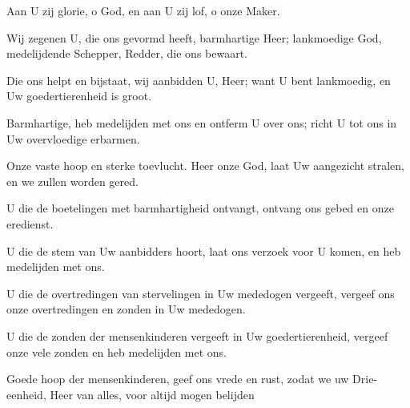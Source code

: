 \documentclass[12pt,twoside,a5paper]{article}
\begin{document}



\begin{halfparskip}
  Aan U zij glorie, o God, en aan U zij lof, o onze Maker.

  Wij zegenen U, die ons gevormd heeft, barmhartige Heer; lankmoedige God, medelijdende Schepper, Redder, die ons bewaart.

  Die ons helpt en bijstaat, wij aanbidden U, Heer; want U bent lankmoedig, en Uw goedertierenheid is groot.

  Barmhartige, heb medelijden met ons en ontferm U over ons; richt U tot ons in Uw overvloedige erbarmen.

  Onze vaste hoop en sterke toevlucht. Heer onze God, laat Uw aangezicht stralen, en we zullen worden gered.

  U die de boetelingen met barmhartigheid ontvangt, ontvang ons gebed en onze eredienst.

  U die de stem van Uw aanbidders hoort, laat ons verzoek voor U komen, en heb medelijden met ons.

  U die de overtredingen van stervelingen in Uw mededogen vergeeft, vergeef ons onze overtredingen en zonden in Uw mededogen.

  U die de zonden der mensenkinderen vergeeft in Uw goedertierenheid, vergeef onze vele zonden en heb medelijden met ons.

  Goede hoop der mensenkinderen, geef ons vrede en rust, zodat we uw Drie-eenheid, Heer van alles, voor altijd mogen belijden 
\end{halfparskip}

\end{document}
